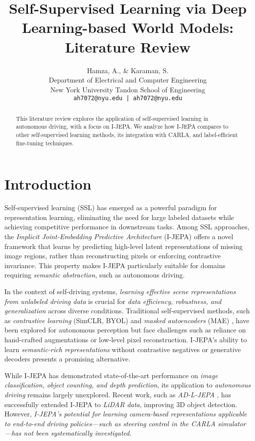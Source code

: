 \documentclass{article}
\title{Self-Supervised Learning via Deep Learning-based World Models: Literature Review}
\author{
    Hamza, A., \& Karaman, S. \\
    Department of Electrical and Computer Engineering \\
    New York University Tandon School of Engineering \\
    \texttt{ah7072@nyu.edu | ah7072@nyu.edu}
}
\begin{document}
\maketitle

\begin{abstract}
    This literature review explores the application of self-supervised learning in autonomous driving, with a focus on I-JEPA. We analyze how I-JEPA compares to other self-supervised learning methods, its integration with CARLA, and label-efficient fine-tuning techniques.
\end{abstract}

\section{Introduction}

Self-supervised learning (SSL) has emerged as a powerful paradigm for representation learning, eliminating the need for large labeled datasets while achieving competitive performance in downstream tasks. Among SSL approaches, the \textit{Implicit Joint-Embedding Predictive Architecture} (I-JEPA) \citep{jean2023ijepa} offers a novel framework that learns by predicting high-level latent representations of missing image regions, rather than reconstructing pixels or enforcing contrastive invariance. This property makes I-JEPA particularly suitable for domains requiring \textit{semantic abstraction}, such as autonomous driving.

In the context of self-driving systems, \textit{learning effective scene representations from unlabeled driving data} is crucial for \textit{data efficiency, robustness, and generalization} across diverse conditions. Traditional self-supervised methods, such as \textit{contrastive learning} (SimCLR, BYOL) \citep{chen2020simple, grill2020bootstrap} and \textit{masked autoencoders} (MAE) \citep{he2022masked}, have been explored for autonomous perception but face challenges such as reliance on hand-crafted augmentations or low-level pixel reconstruction. I-JEPA's ability to learn \textit{semantic-rich representations} without contrastive negatives or generative decoders presents a promising alternative.

While I-JEPA has demonstrated state-of-the-art performance on \textit{image classification, object counting, and depth prediction}, its application to \textit{autonomous driving} remains largely unexplored. Recent work, such as \textit{AD-L-JEPA} \citep{zhu2025adljepa}, has successfully extended I-JEPA to \textit{LiDAR data}, improving 3D object detection. However, \textit{I-JEPA’s potential for learning camera-based representations applicable to end-to-end driving policies—such as steering control in the CARLA simulator—has not been systematically investigated}.
\end{document}

